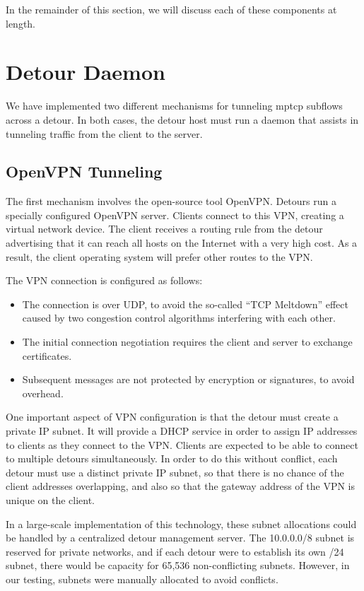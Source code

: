 \documentclass{cwru}
\begin{document}
In the remainder of this section, we will discuss each of these components at
length.

\section{Detour Daemon}

We have implemented two different mechanisms for tunneling \ac{mptcp} subflows across
a detour. In both cases, the detour host must run a daemon that assists in
tunneling traffic from the client to the server.

\subsection{OpenVPN Tunneling}

The first mechanism involves the open-source tool OpenVPN. Detours run a
specially configured OpenVPN server. Clients connect to this VPN, creating a
virtual network device. The client receives a routing rule from the detour
advertising that it can reach all hosts on the Internet with a very high cost.
As a result, the client operating system will prefer other routes to the VPN.

The VPN connection is configured as follows:

\begin{itemize}
\item The connection is over UDP, to avoid the so-called ``TCP Meltdown'' effect
  caused by two congestion control algorithms interfering with each other.
\item The initial connection negotiation requires the client and server to
  exchange certificates.
\item Subsequent messages are not protected by encryption or signatures, to
  avoid overhead.
\end{itemize}

One important aspect of VPN configuration is that the detour must create a
private IP subnet. It will provide a DHCP service in order to assign IP
addresses to clients as they connect to the VPN. Clients are expected to be able
to connect to multiple detours simultaneously. In order to do this without
conflict, each detour must use a distinct private IP subnet, so that there is no
chance of the client addresses overlapping, and also so that the gateway address
of the VPN is unique on the client.

In a large-scale implementation of this technology, these subnet allocations
could be handled by a centralized detour management server. The 10.0.0.0/8
subnet is reserved for private networks, and if each detour were to establish
its own /24 subnet, there would be capacity for 65,536 non-conflicting subnets.
However, in our testing, subnets were manually allocated to avoid conflicts.
\end{document}
